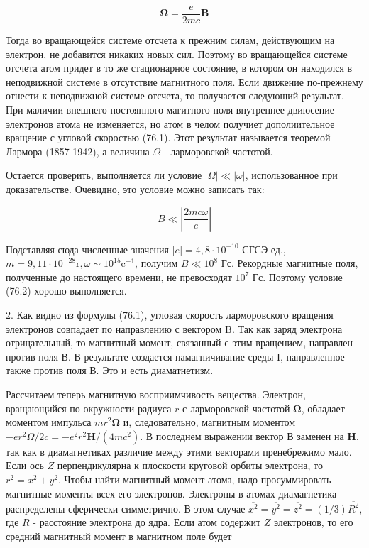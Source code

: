 \documentclass[12pt]{article}
\begin{document}
  $$
  \boldsymbol{\Omega}=\frac{e}{2 m c} \mathbf{B}
  $$


  Тогда во вращающейся системе отсчета к прежним силам, действующим на электрон, не добавится никаких новых сил. Поэтому во вращающейся системе отсчета атом придет в то же стационарное состояние, в котором он находился в неподвижной системе в отсутствие магнитного поля. Если движение по-прежнему отнести к неподвижной системе отсчета, то получается следующий результат. При маличии внешнего постоянного магитного поля внутреннее двиюсение электронов атома не изменяется, но атом в челом получиет дополиительное вращение с угловой скоростью (76.1). Этот результат называется теоремой Лармора (1857-1942), а величина $\Omega$ - ларморовской частотой.

  Остается проверить, выполняется ли условие $|\Omega| \ll|\omega|$, использованное при доказательстве. Очевидно, это условие можно записать так:

  $$
  B \ll\left|\frac{2 m c \omega}{e}\right|
  $$


  Подставляя сюда численные значения $|e|=4,8 \cdot 10^{-10}$ СГСЭ-ед., $m=9,11 \cdot 10^{-28} \mathrm{r}, \omega \sim 10^{15} \mathrm{c}^{-1}$, получим $B \ll 10^8$ Гс. Рекордные магнитные поля, полученные до настоящего времени, не превосходят $10^7$ Гс. Поэтому условие (76.2) хорошо выполняется.

  2. Как видно из формулы (76.1), угловая скорость ларморовского вращения электронов совпадает по направлению с вектором B. Так как заряд электрона отрицательный, то магнитный момент, связанный с этим вращением, направлен против поля В. В результате создается намагничивание среды I, направленное также против поля В. Это и есть диаматнетизм.

  Рассчитаем теперь магнитную восприимчивость вещества. Электрон, вращающийся по окружности радиуса $r$ с ларморовской частотой $\boldsymbol{\Omega}$, обладает моментом импульса $m r^2 \boldsymbol{\Omega}$ и, следовательно, магнитным моментом $-e r^2 \Omega / 2 c=-e^2 r^2 \mathbf{H} /\left(4 m c^2\right)$. В последнем выражении вектор В заменен на $\mathbf{H}$, так как в диамагнетиках различие между этими векторами пренебрежимо мало. Если ось $Z$ перпендикулярна
  к плоскости круговой орбиты электрона, то $r^2=x^2+y^2$. Чтобы найти магнитный момент атома, надо просуммировать магнитные моменты всех его электронов. Электроны в атомах диамагнетика распределены сферически симметрично. В этом случае $\overline{x^2}=\overline{y^2}=\overline{z^2}=(1 / 3) \overline{R^2}$, где $R$ - расстояние электрона до ядра. Если атом содержит $Z$ электронов, то его средний магнитный момент в магнитном поле будет
\end{document}
